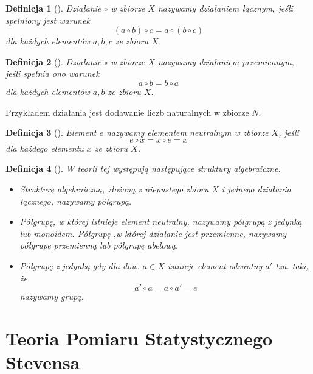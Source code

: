 \documentclass[12pt,a4paper]{report}
\newtheorem{definition}{Definicja}[chapter]
\begin{document}
\begin{definition}[{\citep[Sec 4.1 Def. 4.3]{jedrzejewski2011algebra}}]
Działanie $\circ$ w zbiorze $X$ nazywamy działaniem łącznym, jeśli spełniony jest warunek 
\begin{equation*}
(a\circ b)\circ c = a\circ(b\circ c)
\end{equation*} 
dla każdych elementów $a,b,c$ ze zbioru $X$.
\end{definition}
\begin{definition}[{\citep[Sec 4.1 Def. 4.4]{jedrzejewski2011algebra}}]
Działanie $\circ$ w zbiorze $X$ nazywamy działaniem przemiennym, jeśli spełnia ono warunek
\begin{equation*}
a\circ b=b\circ a
\end{equation*}
dla każdych elementów $a,b$ ze zbioru $X$.
\end{definition}
Przykładem działania jest dodawanie liczb naturalnych w zbiorze $N$.
\begin{definition}[{\citep[Sec 4.1 Def. 4.8]{jedrzejewski2011algebra}}]
Element $e$ nazywamy elementem neutralnym w zbiorze $X$, jeśli 
\begin{equation*}
e\circ x = x\circ e = x
\end{equation*}
dla każdego elementu $x$ ze zbioru $X$.
\end{definition}


\begin{definition}[{\citep[Sec 4.2]{jedrzejewski2011algebra}}]
W teorii tej występują następujące struktury algebraiczne.
\begin{itemize}
\item
Strukturę algebraiczną, złożoną z niepustego zbioru $X$ i jednego działania łącznego, nazywamy półgrupą.
\item
Półgrupę, w której istnieje element neutralny, nazywamy półgrupą z jedynką lub monoidem. Półgrupę ,w której działanie jest przemienne, nazywamy półgrupę przemienną lub półgrupę abelową. 
\item
Półgrupę z jedynką gdy dla dow. $a \in X$ istnieje element odwrotny $a'$ tzn. taki, że 
$$
a'\circ a = a \circ a' =e
$$
nazywamy grupą.
\end{itemize}
\end{definition}




\chapter{Teoria Pomiaru Statystycznego Stevensa}
\end{document}
